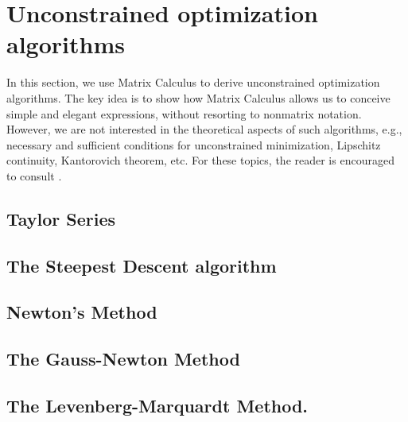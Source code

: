 \section{Unconstrained optimization algorithms}

In this section, we use Matrix Calculus to derive unconstrained optimization algorithms. The key idea is to show how Matrix Calculus allows us to conceive simple and elegant expressions, without resorting to nonmatrix notation. However, we are not interested in the theoretical aspects of such algorithms, e.g., necessary and sufficient conditions for unconstrained minimization, Lipschitz continuity, Kantorovich theorem, etc. For these topics, the reader is encouraged to consult \cite{dennisNumericalMethodsUnconstrained1996}.

\subsection{Taylor Series}


\subsection{The Steepest Descent algorithm}

\subsection{Newton's Method}

\subsection{The Gauss-Newton Method}

\subsection{The Levenberg-Marquardt Method.}

